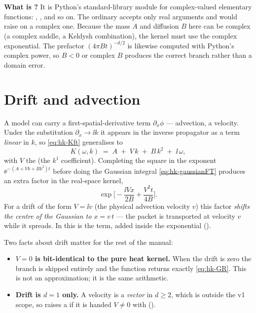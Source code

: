 \begin{note}
\textbf{What is ?} It is Python's standard-library module for
complex-valued elementary functions: , , and so
on. The ordinary  accepts only real arguments and would raise on
a complex one. Because the mass $A$ and diffusion $B$ here can be complex (a
complex saddle, a Keldysh combination), the kernel must use the complex
exponential. The prefactor $(4\pi B t)^{-d/2}$ is likewise computed with
Python's complex power, so $B<0$ or complex $B$ produces the correct branch
rather than a domain error.
\end{note}

\section{Drift and advection}\label{sec:hk-drift}

A model can carry a first-spatial-derivative term $\partial_x\phi$ ---
advection, a velocity. Under the substitution $\partial_x \to \ii k$ it appears
in the inverse propagator as a term \emph{linear} in $k$, so \eqref{eq:hk-Kft}
generalises to
\begin{equation}
  K(\omega,k) \;=\; A \;+\; V\,k \;+\; B\,k^{2} \;+\; \ii\,\omega,
  \label{eq:hk-Kdrift}
\end{equation}
with $V$ the  (the $k^{1}$ coefficient). Completing the square in
the exponent $\ee^{-(A + Vk + Bk^{2})t}$ before doing the Gaussian integral
\eqref{eq:hk-gaussianFT} produces an extra factor in the real-space kernel,
\begin{equation}
  \exp\!\Big[-\frac{\ii V x}{2B} + \frac{V^{2} t}{4B}\Big].
  \label{eq:hk-driftfactor}
\end{equation}
For a drift of the form $V=\ii v$ (the physical advection velocity $v$) this
factor \emph{shifts the centre of the Gaussian to $x = v\,t$} --- the packet is
transported at velocity $v$ while it spreads. In 
this is the  term, added inside the exponential
().

Two facts about drift matter for the rest of the manual:

\begin{itemize}
  \item \textbf{$V=0$ is bit-identical to the pure heat kernel.} When the drift
        is zero the  branch is skipped entirely and the function
        returns exactly \eqref{eq:hk-GR}. This is not an approximation; it is the
        same arithmetic.
  \item \textbf{Drift is $d=1$ only.} A velocity is a \emph{vector} in $d\ge 2$,
        which is outside the v1 scope, so  raises a
         if it is handed $V\ne 0$ with
         ().
\end{itemize}

